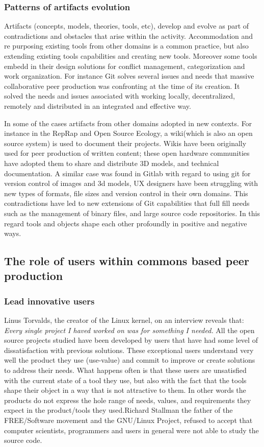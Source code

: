 \documentclass{ICED-Paper}%
\begin{document}
\subsubsection{Patterns of artifacts evolution}
Artifacts (concepts, models, theories, tools, etc), develop and evolve as part of contradictions and obstacles that arise within the activity. Accommodation and re purposing existing tools from other domains is a common practice, but also extending existing tools capabilities and creating new tools. Moreover some tools embedd in their design solutions for conflict management, categorization and work organization. For instance Git solves several issues and needs that massive collaborative peer production was confronting at the time of its creation. It solved the needs and issues associated with working locally, decentralized, remotely and distributed in an integrated and effective way.
\bigskip

In some of the cases artifacts from other domains adopted in new contexts. For instance in the RepRap and Open Source Ecology, a wiki(which is also an open source system) is used to document their projects. Wikis have been originally used for peer production of written content; these open hardware communities have adopted them to share and distribute 3D models, and technical documentation. A similar case was found in Gitlab with regard to using git for version control of images and 3d models, UX designers have been struggling with new types of formats, file sizes and version control in their own domains. This contradictions have led to new extensions of Git capabilities that full fill needs such as the management of binary files, and large source code repositories. In this regard tools and objects shape each other profoundly in positive and negative ways.
\subsection{The role of users within commons based peer production}
\subsubsection{Lead innovative users}

Linus Torvalds, the creator of the Linux kernel, on an interview reveals that: \emph{Every single project I haved worked on was for something I needed.} All the open source projects studied have been developed by users that have had some level of dissatisfaction with previous solutions. These exceptional users understand very well the product they use (use-value) and commit to improve or create solutions to address their needs. What happens often is that these users are unsatisfied with the current state of a tool they use, but also with the fact that the tools shape their object in a way that is not attractive to them. In other words the products do not express the hole range of needs, values, and requirements they expect in the product/tools they used.Richard Stallman the father of the FREE/Software movement and the GNU/Linux Project, refused to accept that computer scientists, programmers and users in general were not able to study the source code.
\bigskip
\end{document}
